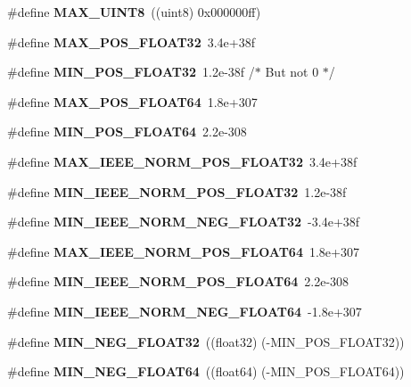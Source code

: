 \begin{DoxyCompactItemize}
\item 
\#define {\bfseries M\-A\-X\-\_\-\-U\-I\-N\-T8}~((uint8)  0x000000ff)\label{prim__type_8h_a05682ca8de174141447ff05a2289a27c}

\item 
\#define {\bfseries M\-A\-X\-\_\-\-P\-O\-S\-\_\-\-F\-L\-O\-A\-T32}~3.\-4e+38f\label{prim__type_8h_a763737bb762908f1014777705e1bd5e0}

\item 
\#define {\bfseries M\-I\-N\-\_\-\-P\-O\-S\-\_\-\-F\-L\-O\-A\-T32}~1.\-2e-\/38f	/$\ast$ But not 0 $\ast$/\label{prim__type_8h_a6ebe6d883694f66620b6d2dd94dc38e8}

\item 
\#define {\bfseries M\-A\-X\-\_\-\-P\-O\-S\-\_\-\-F\-L\-O\-A\-T64}~1.\-8e+307\label{prim__type_8h_a63f40e6ca19e802259413c04cc56bd28}

\item 
\#define {\bfseries M\-I\-N\-\_\-\-P\-O\-S\-\_\-\-F\-L\-O\-A\-T64}~2.\-2e-\/308\label{prim__type_8h_a2fc3595771a7d0f944470fd9ba07cfad}

\item 
\#define {\bfseries M\-A\-X\-\_\-\-I\-E\-E\-E\-\_\-\-N\-O\-R\-M\-\_\-\-P\-O\-S\-\_\-\-F\-L\-O\-A\-T32}~3.\-4e+38f\label{prim__type_8h_ab806e0c70417e38f2302635bbb78c8c5}

\item 
\#define {\bfseries M\-I\-N\-\_\-\-I\-E\-E\-E\-\_\-\-N\-O\-R\-M\-\_\-\-P\-O\-S\-\_\-\-F\-L\-O\-A\-T32}~1.\-2e-\/38f\label{prim__type_8h_a8b4a04ec8b6561c6f831dfd2434fd505}

\item 
\#define {\bfseries M\-I\-N\-\_\-\-I\-E\-E\-E\-\_\-\-N\-O\-R\-M\-\_\-\-N\-E\-G\-\_\-\-F\-L\-O\-A\-T32}~-\/3.\-4e+38f\label{prim__type_8h_a7dcce0312b93eb66d4e662fd035560bf}

\item 
\#define {\bfseries M\-A\-X\-\_\-\-I\-E\-E\-E\-\_\-\-N\-O\-R\-M\-\_\-\-P\-O\-S\-\_\-\-F\-L\-O\-A\-T64}~1.\-8e+307\label{prim__type_8h_a424bb3e6f9a39ec4d9f0ed965ab92026}

\item 
\#define {\bfseries M\-I\-N\-\_\-\-I\-E\-E\-E\-\_\-\-N\-O\-R\-M\-\_\-\-P\-O\-S\-\_\-\-F\-L\-O\-A\-T64}~2.\-2e-\/308\label{prim__type_8h_aa8adb129a54c32e19ba7cc9171779687}

\item 
\#define {\bfseries M\-I\-N\-\_\-\-I\-E\-E\-E\-\_\-\-N\-O\-R\-M\-\_\-\-N\-E\-G\-\_\-\-F\-L\-O\-A\-T64}~-\/1.\-8e+307\label{prim__type_8h_ad8550cd6490d48fd6f4949626084fbdb}

\item 
\#define {\bfseries M\-I\-N\-\_\-\-N\-E\-G\-\_\-\-F\-L\-O\-A\-T32}~((float32) (-\/M\-I\-N\-\_\-\-P\-O\-S\-\_\-\-F\-L\-O\-A\-T32))\label{prim__type_8h_a98d8dffc8bc9036591980531b57e7f19}

\item 
\#define {\bfseries M\-I\-N\-\_\-\-N\-E\-G\-\_\-\-F\-L\-O\-A\-T64}~((float64) (-\/M\-I\-N\-\_\-\-P\-O\-S\-\_\-\-F\-L\-O\-A\-T64))\label{prim__type_8h_a2e65d00cc854972aae6f58d9cb7d383f}

\end{DoxyCompactItemize}
